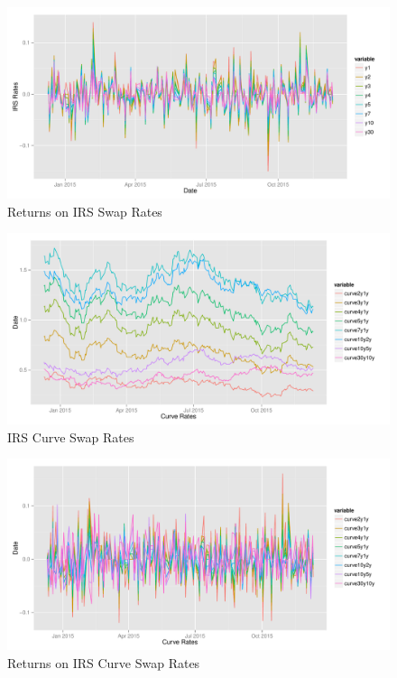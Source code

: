\begin{figure}[H]
\centering\includegraphics[width=\textwidth]{descriptive-rates-returns.pdf}
\caption{Returns on IRS Swap Rates}
\label{fig:descriptive-rates-returns}
\end{figure}

\begin{figure}[H]
\centering\includegraphics[width=\textwidth]{descriptive-curve-rates.pdf}
\caption{IRS Curve Swap Rates}
\label{fig:descriptive-curve-rates}
\end{figure}

\begin{figure}[H]
\centering\includegraphics[width=\textwidth]{descriptive-curve-rates-returns.pdf}
\caption{Returns on IRS Curve Swap Rates}
\label{fig:descriptive-curve-rates-returns}
\end{figure}

